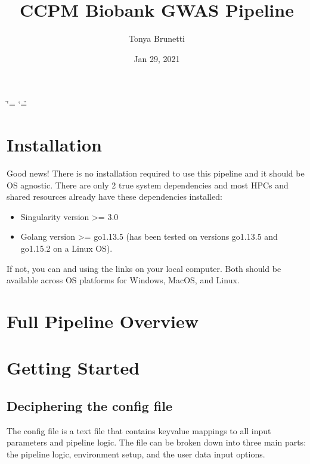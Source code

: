\documentclass[letterpaper,10pt,english]{sphinxmanual}
\title{CCPM Biobank GWAS Pipeline}
\date{Jan 29, 2021}
\author{Tonya Brunetti}
\let\sphinxpxdimen\pdfpxdimen\else\newdimen\sphinxpxdimen
\begin{document}
\ifdefined\shorthandoff
  \ifnum\catcode`\=\string=\active\shorthandoff{=}\fi
  \ifnum\catcode`\"=\active{}\fi
\fi

\pagestyle{empty}
\sphinxmaketitle
\pagestyle{plain}
\sphinxtableofcontents
\pagestyle{normal}
\label{\detokenize{index::doc}}



\chapter{Installation}
\label{\detokenize{index:installation}}
Good news!  There is no installation required to use this pipeline and it should be OS agnostic.  There are only 2 true system dependencies and most HPCs and shared resources already have these dependencies installed:
\begin{itemize}
\item {} 
Singularity version \textgreater{}= 3.0

\item {} 
Golang version \textgreater{}= go1.13.5 (has been tested on versions go1.13.5 and go1.15.2 on a Linux OS).

\end{itemize}

If not, you can  and  using the links on your local computer.  Both should be available across OS platforms for Windows, MacOS, and Linux.


\chapter{Full Pipeline Overview}
\label{\detokenize{index:full-pipeline-overview}}
\noindent\sphinxincludegraphics[width=800\sphinxpxdimen]{{fullPipeline}.png}


\chapter{Getting Started}
\label{\detokenize{index:getting-started}}

\section{Deciphering the config file}
\label{\detokenize{decipheringConfig:deciphering-the-config-file}}\label{\detokenize{decipheringConfig::doc}}
The config file is a text file that contains key\sphinxhyphen{}value mappings to all input parameters and pipeline logic. The file can be broken down into three main parts: the pipeline logic, environment setup, and the user data input options.
\end{document}
